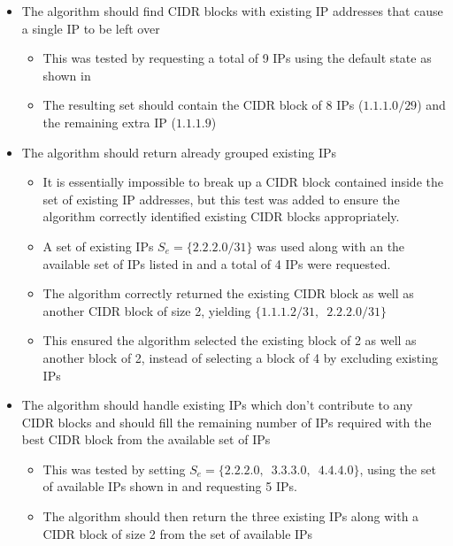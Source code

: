 \begin{itemize}
\begin{itemize}
      \end{itemize}
\item{The algorithm should find CIDR blocks with existing IP addresses that cause a single IP to be left over}
      \begin{itemize}
      \item{This was tested by requesting a total of 9 IPs using the default state as shown in }
      \item{The resulting set should contain the CIDR block of 8 IPs ($1.1.1.0/29$) and the remaining extra IP ($1.1.1.9$)}
      \end{itemize}
\item{The algorithm should return already grouped existing IPs}
      \begin{itemize}
      \item{It is essentially impossible to break up a CIDR block contained inside the set of existing IP addresses, but this test was added to ensure the algorithm correctly identified existing CIDR blocks appropriately.}
      \item{A set of existing IPs $S_e = \{2.2.2.0/31\}$ was used along with an the available set of IPs listed in  and a total of 4 IPs were requested.}
      \item{The algorithm correctly returned the existing CIDR block as well as another CIDR block of size 2, yielding $\{1.1.1.2/31,\enspace2.2.2.0/31\}$}
      \item{This ensured the algorithm selected the existing block of 2 as well as another block of 2, instead of selecting a block of 4 by excluding existing IPs}
      \end{itemize}
\item{The algorithm should handle existing IPs which don't contribute to any CIDR blocks and should fill the remaining number of IPs required with the best CIDR block from the available set of IPs}
      \begin{itemize}
      \item{This was tested by setting $S_e = \{2.2.2.0,\enspace3.3.3.0,\enspace4.4.4.0\}$}, using the set of available IPs shown in  and requesting 5 IPs.
      \item{The algorithm should then return the three existing IPs along with a CIDR block of size 2 from the set of available IPs}
      \end{itemize}
\end{itemize}

